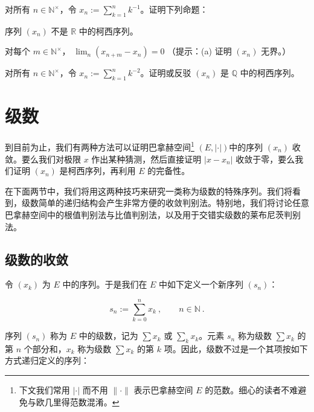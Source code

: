 \begin{exercises}
\item

对所有  $ n \in \mathbb{N}^\times $，令  $ x_n := \sum_{k=1}^{n} k^{-1} $。证明下列命题：

\begin{items}
\item

序列  $ (x_{n}) $ 不是  $ \mathbb{R} $ 中的柯西序列。

\item

对每个  $ m \in \mathbb{N}^\times $， $ \lim_{n}(x_{n+m} - x_n) = 0 $
（提示：(a) 证明  $ (x_{n}) $ 无界。）

\end{items}

\item

对所有  $ n \in \mathbb{N}^\times $，令  $ x_n := \sum_{k=1}^n k^{-2} $。证明或反驳  $ (x_n) $ 是  $ \mathbb{Q} $ 中的柯西序列。

\end{exercises}

\section{级数}

到目前为止，我们有两种方法可以证明巴拿赫空间\footnote{下文我们常用 $|\cdot|$ 而不用 $\|\cdot\|$ 表示巴拿赫空间 $E$ 的范数。细心的读者不难避免与欧几里得范数混淆。} $(E,|\cdot|)$中的序列 $(x_n)$ 收敛。要么我们对极限 $x$ 作出某种猜测，然后直接证明 $|x-x_n|$ 收敛于零，要么我们证明 $(x_n)$ 是柯西序列，再利用 $E$ 的完备性。

在下面两节中，我们将用这两种技巧来研究一类称为级数的特殊序列。我们将看到，级数简单的递归结构会产生非常方便的收敛判别法。特别地，我们将讨论任意巴拿赫空间中的根值判别法与比值判别法，以及用于交错实级数的莱布尼茨判别法。

\subsection*{级数的收敛}

令 $ (x_{k}) $ 为 $E$ 中的序列。于是我们在 $E$ 中如下定义一个新序列 $ (s_{n}) $：

\[
s_{n}:=\sum_{k=0}^{n}x_{k}~,\qquad n\in\mathbb{N}~.
\]

序列 $(s_n)$ 称为 $E$ 中的级数，记为 $\sum x_k$ 或 $\sum_k x_k$。元素 $s_n$ 称为级数 $\sum x_k$ 的第 $n$ 个部分和，$x_k$ 称为级数 $\sum x_k$ 的第 $k$ 项。因此，级数不过是一个其项按如下方式递归定义的序列：

